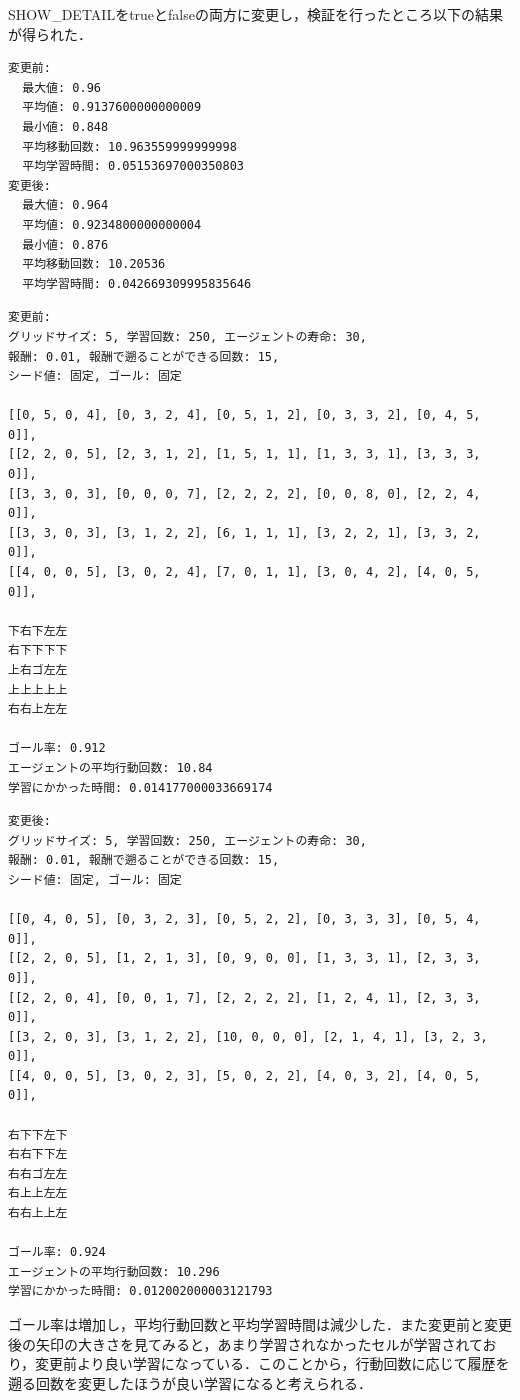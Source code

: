 \documentclass[a4j,11pt]{jarticle}
\begin{document}
SHOW\_DETAILをtrueとfalseの両方に変更し，検証を行ったところ以下の結果が得られた．

\begin{verbatim}
変更前:
  最大値: 0.96
  平均値: 0.9137600000000009
  最小値: 0.848
  平均移動回数: 10.963559999999998
  平均学習時間: 0.05153697000350803
変更後:
  最大値: 0.964
  平均値: 0.9234800000000004
  最小値: 0.876
  平均移動回数: 10.20536
  平均学習時間: 0.042669309995835646
\end{verbatim}

\begin{verbatim}
変更前:
グリッドサイズ: 5, 学習回数: 250, エージェントの寿命: 30,
報酬: 0.01, 報酬で遡ることができる回数: 15,
シード値: 固定, ゴール: 固定

[[0, 5, 0, 4], [0, 3, 2, 4], [0, 5, 1, 2], [0, 3, 3, 2], [0, 4, 5, 0]],
[[2, 2, 0, 5], [2, 3, 1, 2], [1, 5, 1, 1], [1, 3, 3, 1], [3, 3, 3, 0]],
[[3, 3, 0, 3], [0, 0, 0, 7], [2, 2, 2, 2], [0, 0, 8, 0], [2, 2, 4, 0]],
[[3, 3, 0, 3], [3, 1, 2, 2], [6, 1, 1, 1], [3, 2, 2, 1], [3, 3, 2, 0]],
[[4, 0, 0, 5], [3, 0, 2, 4], [7, 0, 1, 1], [3, 0, 4, 2], [4, 0, 5, 0]],

下右下左左
右下下下下
上右ゴ左左
上上上上上
右右上左左

ゴール率: 0.912
エージェントの平均行動回数: 10.84
学習にかかった時間: 0.014177000033669174
\end{verbatim}

\begin{verbatim}
変更後:
グリッドサイズ: 5, 学習回数: 250, エージェントの寿命: 30,
報酬: 0.01, 報酬で遡ることができる回数: 15,
シード値: 固定, ゴール: 固定

[[0, 4, 0, 5], [0, 3, 2, 3], [0, 5, 2, 2], [0, 3, 3, 3], [0, 5, 4, 0]],
[[2, 2, 0, 5], [1, 2, 1, 3], [0, 9, 0, 0], [1, 3, 3, 1], [2, 3, 3, 0]],
[[2, 2, 0, 4], [0, 0, 1, 7], [2, 2, 2, 2], [1, 2, 4, 1], [2, 3, 3, 0]],
[[3, 2, 0, 3], [3, 1, 2, 2], [10, 0, 0, 0], [2, 1, 4, 1], [3, 2, 3, 0]],
[[4, 0, 0, 5], [3, 0, 2, 3], [5, 0, 2, 2], [4, 0, 3, 2], [4, 0, 5, 0]],

右下下左下
右右下下左
右右ゴ左左
右上上左左
右右上上左

ゴール率: 0.924
エージェントの平均行動回数: 10.296
学習にかかった時間: 0.012002000003121793
\end{verbatim}

ゴール率は増加し，平均行動回数と平均学習時間は減少した．また変更前と変更後の矢印の大きさを見てみると，あまり学習されなかったセルが学習されており，変更前より良い学習になっている．このことから，行動回数に応じて履歴を遡る回数を変更したほうが良い学習になると考えられる．
\end{document}
